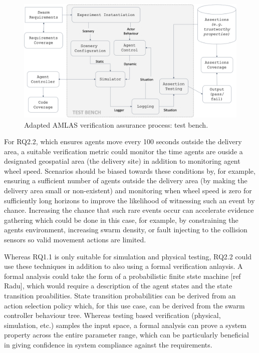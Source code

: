 \documentclass[lettersize,journal]{IEEEtran}
\begin{document}
\begin{figure}
	\centering
	\includegraphics[width=1.0\textwidth]{figures/verification-testbench.png}
	\caption{Adapted AMLAS verification assurance process: test bench.}
	\label{amlas-a-testbench}
\end{figure}

For RQ2.2, which ensures agents move every 100 seconds outside the delivery area, a suitable verification metric could monitor the time agents are ouside a designated geospatial area (the delivery site) in addition to monitoring agent wheel speed. Scenarios should be biased towards these conditions by, for example, ensuring a sufficient number of agents outside the delivery area (by making the delivery area small or non-existent) and monitoring when wheel speed is zero for sufficiently long horizons to improve the likelihood of witnessing such an event by chance. Increasing the chance that such rare events occur can accelerate evidence gathering which could be done in this case, for example, by constraining the agents environment, increasing swarm density, or fault injecting to the collision sensors so valid movement actions are limited. 

Whereas RQ1.1 is only suitable for simulation and physical testing, RQ2.2 could use these techniques in addition to also using a formal verification anlaysis. A formal analysis could take the form of a probabilistic finite stste machine [ref Radu], which would require a description of the agent states and the state transition proabilities. State transition probabilities can be derived from an action selection policy which, for this use case, can be derived from the swarm controller behaviour tree. Whereas testing based verification (physical, simulation, etc.) samples the input space, a formal analysis can prove a system property across the entire parameter range, which can be particularly beneficial in giving confidence in system compliance against the requirements. 
\end{document}

